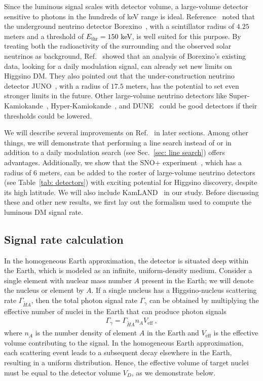 \documentclass[aps,prd,amsmath,amssymb,10pt,letterpaper,balancelastpage,showpacs,superscriptaddress,nofootinbib,floatfix,notitlepage,longbibliography,twocolumn
]{revtex4-2}
\newcommand{\numcolor}[1]{\textcolor{black}{#1}}
\newcommand{\Gg}{\Gamma_{\gamma}}
\newcommand{\GxA}{\Gamma_{\Ht A}}
\newcommand{\Veff}{V_{\text{eff}}}
\newcommand{\Ethr}{E_{\text{thr}}}
\newcommand{\Ht}{\tilde{H}}
\begin{document}
Since the luminous signal scales with detector volume, a large-volume detector sensitive to photons in the hundreds of keV range is ideal. Reference~\cite{Luminous} noted that the underground neutrino detector Borexino~\cite{Borexino_Latest}, with a scintillator radius of $4.25$ meters and a threshold of \numcolor{$\Ethr = 150$ keV}, is well suited for this purpose. By treating both the radioactivity of the surrounding and the observed solar neutrinos as background, Ref.~\cite{Luminous} showed that an analysis of Borexino's existing data, looking for a daily modulation signal, can already set new limits on Higgsino DM. They also pointed out that the under-construction neutrino detector JUNO~\cite{JUNO_Conceptual}, with a radius of $17.5$ meters, has the potential to set even stronger limits in the future. Other large-volume neutrino detectors like Super-Kamiokande~\cite{superK}, Hyper-Kamiokande~\cite{HyperK}, and DUNE~\cite{DUNE} could be good detectors if their thresholds could be lowered.

We will describe several improvements on Ref.~\cite{Luminous} in later sections. Among other things, we will demonstrate that performing a line search instead of or in addition to a daily modulation search (see Sec.~\ref{sec: line search}) offers advantages. Additionally, we show that the SNO+ experiment~\cite{SNO+}, which has a radius of $6$ meters, can be added to the roster of large-volume neutrino detectors (see Table~\ref{tab: detectors}) with exciting potential for Higgsino discovery, despite its high latitude. We will also include KamLAND~\cite{Kamland} in our study.
Before discussing these and other new results, we first lay out the formalism used to compute the luminous DM signal rate.

\subsection{Signal rate calculation\label{sec:signal rate calculation}}
In the homogeneous Earth approximation, the detector is situated deep within the Earth, which is modeled as an infinite, uniform-density medium. Consider a single element with nuclear mass number $A$ present in the Earth; we will denote the nucleus or element by $A$. 
If a single nucleus has a Higgsino-nucleus scattering rate $\GxA$, then the total photon signal rate $\Gg$ can be obtained by multiplying the effective number of nuclei in the Earth that can produce photon signals
\begin{align}
    \Gg = \GxA n_A \Veff~,
\end{align}
where $n_A$ is the number density of element $A$ in the Earth and $\Veff$ is the effective volume contributing to the signal. In the homogeneous Earth approximation, each scattering event leads to a subsequent decay elsewhere in the Earth, resulting in a uniform distribution. Hence, the effective volume of target nuclei must be equal to the detector volume $V_D$, as we demonstrate below.
\end{document}
